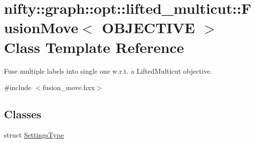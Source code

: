 \hypertarget{classnifty_1_1graph_1_1opt_1_1lifted__multicut_1_1FusionMove}{}\section{nifty\+:\+:graph\+:\+:opt\+:\+:lifted\+\_\+multicut\+:\+:Fusion\+Move$<$ O\+B\+J\+E\+C\+T\+I\+VE $>$ Class Template Reference}
\label{classnifty_1_1graph_1_1opt_1_1lifted__multicut_1_1FusionMove}


Fuse multiple labels into single one w.\+r.\+t. a Lifted\+Multicut objective.  




{\ttfamily \#include $<$fusion\+\_\+move.\+hxx$>$}

\subsection*{Classes}
\begin{DoxyCompactItemize}
\item 
struct \hyperlink{structnifty_1_1graph_1_1opt_1_1lifted__multicut_1_1FusionMove_1_1SettingsType}{Settings\+Type}
\end{DoxyCompactItemize}
